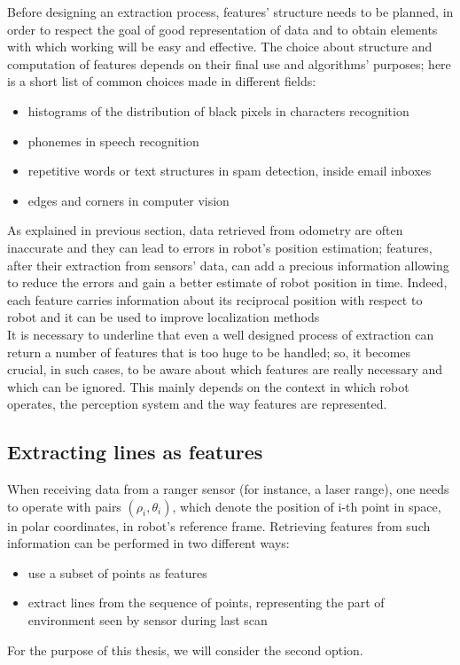 \documentclass[a4paper, onecolumn]{report}
\begin{document}
Before designing an extraction process, features' structure needs to be planned, in order to respect the goal of good representation of data and to obtain elements with which working will be easy and effective.
The choice about structure and computation of features depends on their final use and algorithms' purposes; here is a short list of common choices made in different fields:
\begin{itemize}
	\item{histograms of the distribution of black pixels in characters recognition}
	\item{phonemes in speech recognition}
	\item{repetitive words or text structures in spam detection, inside email inboxes}
	\item{edges and corners in computer vision}
\end{itemize}

As explained in previous section, data retrieved from odometry are often inaccurate and they can lead to errors in robot's position estimation; features, after their extraction from sensors' data, can add a precious information allowing to reduce the errors and gain a better estimate of robot position in time. Indeed, each feature carries information about its reciprocal position with respect to robot and it can be used to improve localization methods\\
It is necessary to underline that even a well designed process of extraction can return a number of features that is too huge to be handled; so, it becomes crucial, in such cases, to be aware about which features are really necessary and which can be ignored. This mainly depends on the context in which robot operates, the perception system and the way features are represented.

\subsection{Extracting lines as features}
When receiving data from a ranger sensor (for instance, a laser range), one needs to operate with pairs $(\rho_i, \theta_i)$, which denote the position of i-th point in space, in polar coordinates, in robot's reference frame. Retrieving features from such information can be performed in two different ways:
\begin{itemize}
	\item{use a subset of points as features}
	\item{extract lines from the sequence of points, representing the part of environment seen by sensor during last scan}
\end{itemize}
For the purpose of this thesis, we will consider the second option.
\end{document}
